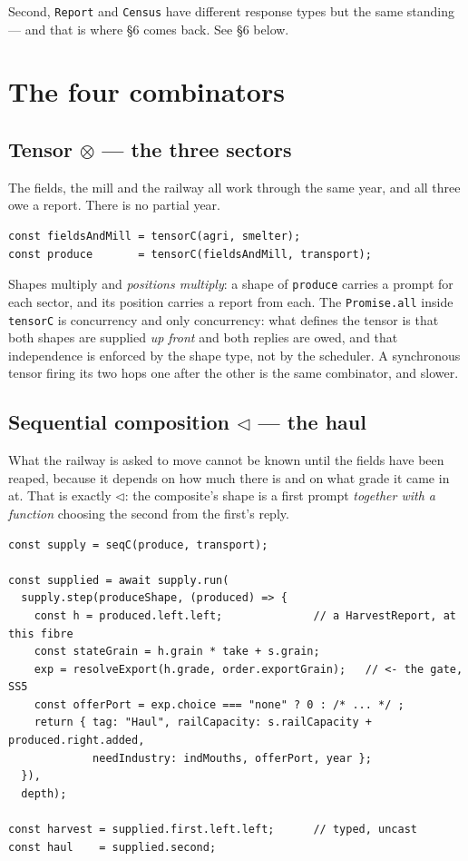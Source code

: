 \documentclass[11pt,a4paper]{article}
\begin{document}
Second, \verb|Report| and \verb|Census| have different response types but the
same standing --- and that is where \S6 comes back. See \S6 below.

\section{The four combinators}

\subsection{Tensor $\otimes$ --- the three sectors}

The fields, the mill and the railway all work through the same year, and all
three owe a report. There is no partial year.

\begin{lstlisting}[language=TS]
const fieldsAndMill = tensorC(agri, smelter);
const produce       = tensorC(fieldsAndMill, transport);
\end{lstlisting}

\noindent Shapes multiply and \emph{positions multiply}: a shape of
\verb|produce| carries a prompt for each sector, and its position carries a
report from each. The \verb|Promise.all| inside \verb|tensorC| is concurrency
and only concurrency: what defines the tensor is that both shapes are supplied
\emph{up front} and both replies are owed, and that independence is enforced by
the shape type, not by the scheduler. A synchronous tensor firing its two hops
one after the other is the same combinator, and slower.

\subsection{Sequential composition $\lhd$ --- the haul}

What the railway is asked to move cannot be known until the fields have been
reaped, because it depends on how much there is and on what grade it came in
at. That is exactly $\lhd$: the composite's shape is a first prompt
\emph{together with a function} choosing the second from the first's reply.

\begin{lstlisting}[language=TS]
const supply = seqC(produce, transport);

const supplied = await supply.run(
  supply.step(produceShape, (produced) => {
    const h = produced.left.left;              // a HarvestReport, at this fibre
    const stateGrain = h.grain * take + s.grain;
    exp = resolveExport(h.grade, order.exportGrain);   // <- the gate, SS5
    const offerPort = exp.choice === "none" ? 0 : /* ... */ ;
    return { tag: "Haul", railCapacity: s.railCapacity + produced.right.added,
             needIndustry: indMouths, offerPort, year };
  }),
  depth);

const harvest = supplied.first.left.left;      // typed, uncast
const haul    = supplied.second;
\end{lstlisting}
\end{document}

